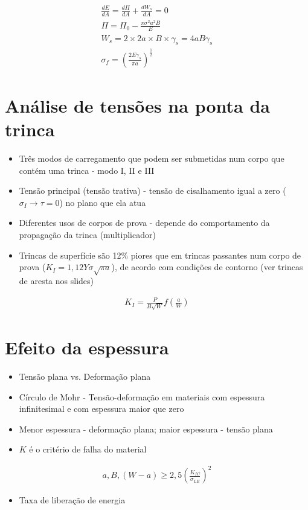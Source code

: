 \begin{multicols*}{2}
    \begin{gather}
        \frac{dE}{dA} = \frac{d \Pi}{dA} + \frac{dW_s}{dA} = 0 \\
        \Pi = \Pi_0 - \frac{\pi \sigma^2 a^2 B}{E} \\
        W_s = 2 \times 2a \times B \times \gamma_s = 4a B \gamma_s \\
        \sigma_f = \left( \frac{2 E \gamma_s}{\pi a} \right)^{\frac{1}{2}}
    \end{gather}

    \section*{Análise de tensões na ponta da trinca}

    \begin{itemize}
        \item Três modos de carregamento que podem ser submetidas num corpo que contém uma trinca - modo I, II e III
        \item Tensão principal (tensão trativa) - tensão de cisalhamento igual a zero ($\sigma_I \rightarrow \tau = 0$) no plano que ela atua
        \item Diferentes usos de corpos de prova - depende do comportamento da propagação da trinca (multiplicador)
        \item Trincas de superfície são 12\% piores que em trincas passantes num corpo de prova ($K_I = 1,12 Y \sigma \sqrt{\pi a}$), de acordo com condições de contorno (ver trincas de aresta nos slides)
    \end{itemize}
    \begin{gather}
        K_I = \frac{P}{B \sqrt{W}} f \left( \frac{a}{W} \right)
    \end{gather}

    \section*{Efeito da espessura}
    \begin{itemize}
        \item Tensão plana vs. Deformação plana
        \item Círculo de Mohr - Tensão-deformação em materiais com espessura infinitesimal e com espessura maior que zero
        \item Menor espessura - deformação plana; maior espessura - tensão plana
        \item $K$ é o critério de falha do material
    \end{itemize}
    \begin{gather}
        a,B,(W-a) \geq 2,5 \left( \frac{K_{IC}}{\sigma_{LE}} \right)^2
    \end{gather}
    \begin{itemize}
        \item Taxa de liberação de energia
    \end{itemize}

\end{multicols*}